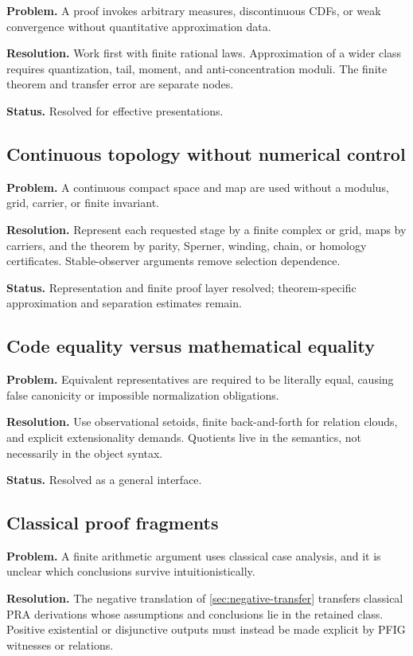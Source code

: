 \textbf{Problem.} A proof invokes arbitrary measures, discontinuous CDFs, or weak convergence without quantitative approximation data.

\textbf{Resolution.} Work first with finite rational laws.  Approximation of a wider class requires quantization, tail, moment, and anti-concentration moduli.  The finite theorem and transfer error are separate nodes.

\textbf{Status.} Resolved for effective presentations.

\subsection{Continuous topology without numerical control}

\textbf{Problem.} A continuous compact space and map are used without a modulus, grid, carrier, or finite invariant.

\textbf{Resolution.} Represent each requested stage by a finite complex or grid, maps by carriers, and the theorem by parity, Sperner, winding, chain, or homology certificates.  Stable-observer arguments remove selection dependence.

\textbf{Status.} Representation and finite proof layer resolved; theorem-specific approximation and separation estimates remain.

\subsection{Code equality versus mathematical equality}

\textbf{Problem.} Equivalent representatives are required to be literally equal, causing false canonicity or impossible normalization obligations.

\textbf{Resolution.} Use observational setoids, finite back-and-forth for relation clouds, and explicit extensionality demands.  Quotients live in the semantics, not necessarily in the object syntax.

\textbf{Status.} Resolved as a general interface.

\subsection{Classical proof fragments}

\textbf{Problem.} A finite arithmetic argument uses classical case analysis, and it is unclear which conclusions survive intuitionistically.

\textbf{Resolution.} The negative translation of \cref{sec:negative-transfer} transfers classical PRA derivations whose assumptions and conclusions lie in the retained class.  Positive existential or disjunctive outputs must instead be made explicit by PFIG witnesses or relations.

